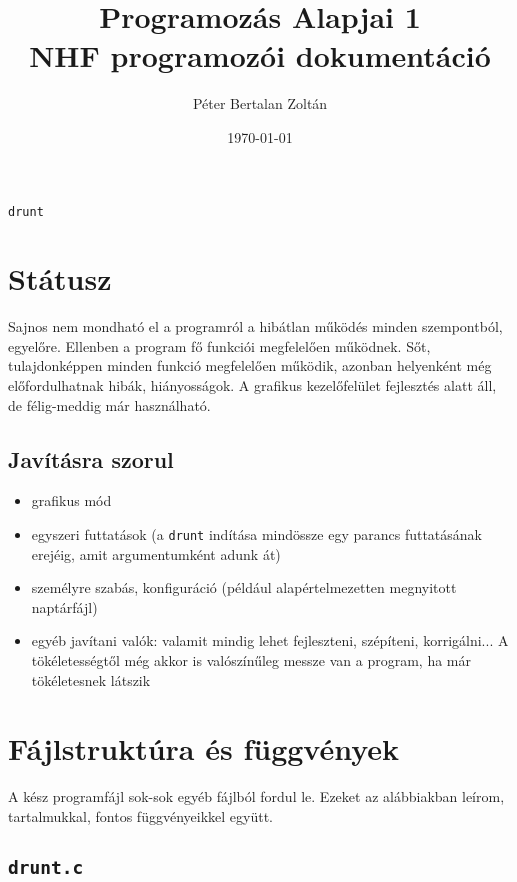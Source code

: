 \documentclass[a4paper]{article}
\title{Programozás Alapjai 1 \\ NHF programozói dokumentáció}
\author{Péter Bertalan Zoltán}
\date{\today}
\begin{document}
	\begin{titlepage}
		\maketitle
		\vspace{4cm}
		\begin{center}
			\Huge
			\texttt{drunt}
		\end{center}
	\end{titlepage}

\section{Státusz}

Sajnos nem mondható el a programról a hibátlan működés minden szempontból, egyelőre. Ellenben a program fő funkciói megfelelően működnek. Sőt, tulajdonképpen minden funkció megfelelően működik, azonban helyenként még előfordulhatnak hibák, hiányosságok. A grafikus kezelőfelület fejlesztés alatt áll, de félig-meddig már használható.

\subsection{Javításra szorul}
\begin{itemize}
	\item grafikus mód
	\item egyszeri futtatások (a \texttt{drunt} indítása mindössze egy parancs futtatásának erejéig, amit argumentumként adunk át)
	\item személyre szabás, konfiguráció (például alapértelmezetten megnyitott naptárfájl)
	\item egyéb javítani valók: valamit mindig lehet fejleszteni, szépíteni, korrigálni... A tökéletességtől még akkor is valószínűleg messze van a program, ha már tökéletesnek látszik
\end{itemize}

\pagebreak

\section{Fájlstruktúra és függvények}

A kész programfájl sok-sok egyéb fájlból fordul le. Ezeket az alábbiakban leírom, tartalmukkal, fontos függvényeikkel együtt.

\subsection{\texttt{drunt.c}}
\end{document}
